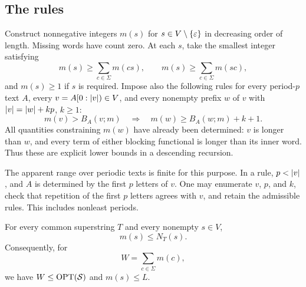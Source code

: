 \subsection{The rules}

Construct nonnegative integers $m(s)$ for $s\in V\setminus\{\varepsilon\}$ in decreasing order of length. Missing words have count zero. At each $s$, take the smallest integer satisfying
\begin{equation}\label{eq:extension-rules}
m(s)\ge\sum_{c\in\Sigma}m(cs),\qquad
m(s)\ge\sum_{c\in\Sigma}m(sc),
\end{equation}
and $m(s)\ge1$ if $s$ is required. Impose also the following rules for every period-$p$ text $A$, every $v=A[0:\lvert v\rvert)\in V$, and every nonempty prefix $w$ of $v$ with $\lvert v\rvert=\lvert w\rvert+kp$, $k\ge1$:
\begin{equation}\label{eq:period-rule}
m(v)>B_A(v;m)
\quad\Longrightarrow\quad
m(w)\ge B_A(w;m)+k+1.
\end{equation}
All quantities constraining $m(w)$ have already been determined: $v$ is longer than $w$, and every term of either blocking functional is longer than its inner word. Thus these are explicit lower bounds in a descending recursion.

The apparent range over periodic texts is finite for this purpose. In a rule, $p<\lvert v\rvert$, and $A$ is determined by the first $p$ letters of $v$. One may enumerate $v$, $p$, and $k$, check that repetition of the first $p$ letters agrees with $v$, and retain the admissible rules. This includes nonleast periods.

\begin{lemma}\label{lem:counts}
For every common superstring $T$ and every nonempty $s\in V$,
\[
m(s)\le N_T(s).
\]
Consequently, for
\begin{equation}\label{eq:W}
W=\sum_{c\in\Sigma}m(c),
\end{equation}
we have $W\le\operatorname{OPT}(\mathcal S)$ and $m(s)\le L$.
\end{lemma}

